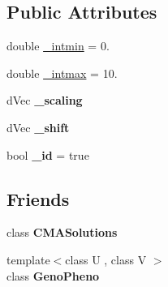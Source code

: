 \subsection*{Public Attributes}
\begin{DoxyCompactItemize}
\item 
double \hyperlink{classlibcmaes_1_1linScalingStrategy_ab5cf302d085ee302ed180a4c29c25bf2}{\+\_\+intmin} = 0.
\item 
double \hyperlink{classlibcmaes_1_1linScalingStrategy_a8d25d3fd0d901c010e925cf786b78d04}{\+\_\+intmax} = 10.
\item 
\hypertarget{classlibcmaes_1_1linScalingStrategy_a483cfaf8bceb634977c9cfd4683766b5}{d\+Vec {\bfseries \+\_\+scaling}}\label{classlibcmaes_1_1linScalingStrategy_a483cfaf8bceb634977c9cfd4683766b5}

\item 
\hypertarget{classlibcmaes_1_1linScalingStrategy_a42023d6a68d1efecb1d8ec3bc6261a9b}{d\+Vec {\bfseries \+\_\+shift}}\label{classlibcmaes_1_1linScalingStrategy_a42023d6a68d1efecb1d8ec3bc6261a9b}

\item 
\hypertarget{classlibcmaes_1_1linScalingStrategy_a61536bec2c52d4649663bb76e82af1b9}{bool {\bfseries \+\_\+id} = true}\label{classlibcmaes_1_1linScalingStrategy_a61536bec2c52d4649663bb76e82af1b9}

\end{DoxyCompactItemize}
\subsection*{Friends}
\begin{DoxyCompactItemize}
\item 
\hypertarget{classlibcmaes_1_1linScalingStrategy_a78b1b9910ebce544de9b54b998e77879}{class {\bfseries C\+M\+A\+Solutions}}\label{classlibcmaes_1_1linScalingStrategy_a78b1b9910ebce544de9b54b998e77879}

\item 
\hypertarget{classlibcmaes_1_1linScalingStrategy_a30b6df18a1c8899440f1ca1273b26bb9}{{\footnotesize template$<$class U , class V $>$ }\\class {\bfseries Geno\+Pheno}}\label{classlibcmaes_1_1linScalingStrategy_a30b6df18a1c8899440f1ca1273b26bb9}

\end{DoxyCompactItemize}


